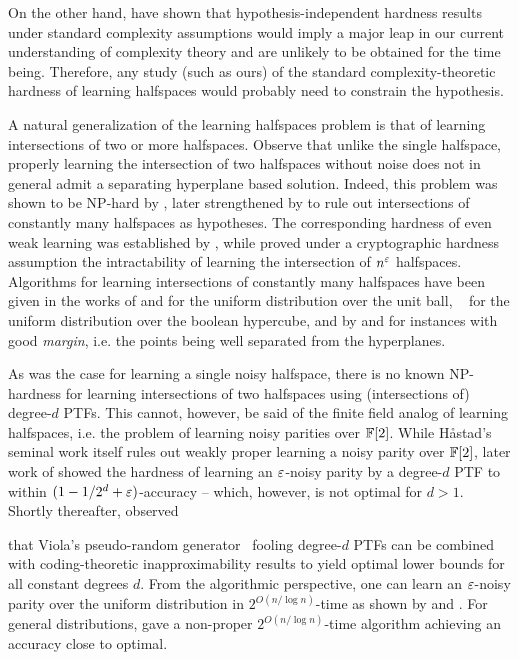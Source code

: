
On the other hand, \cite{ABX08} have shown that hypothesis-independent
hardness results under standard complexity assumptions would imply a
major leap in our current understanding of complexity theory and are
unlikely to be obtained for the time being. Therefore, any 
study (such as ours) of the standard complexity-theoretic hardness of learning
halfspaces would probably need to constrain the hypothesis. 


A natural generalization of the learning halfspaces problem is that of
learning intersections of two or more halfspaces.  Observe that unlike
the single halfspace, properly learning the intersection of two
halfspaces without noise does not in general admit a
separating hyperplane based solution.  Indeed, this problem was shown
to be NP-hard by \cite{BR93}, later strengthened by
\cite{ABFKP08} to
rule out intersections of constantly many halfspaces as hypotheses.
The corresponding hardness of even weak learning was established by
\cite{KS11}, while \cite{KS09}
proved under a cryptographic hardness assumption the intractability of
learning the intersection of $n^\varepsilon$ halfspaces. Algorithms
for learning intersections of constantly many halfspaces have been
given in the works of \cite{BK97} and
\cite{Vempala97} for the uniform distribution over the unit
ball, ~\cite{KOS04} for the uniform
distribution over the boolean hypercube, and by \cite{AV06} and \cite{KlivansS08} for instances
with good \emph{margin}, i.e. the points being well separated from the
hyperplanes.


As was the case for learning a single noisy halfspace, there is
no known NP-hardness for learning intersections of two halfspaces
using (intersections of) degree-$d$ PTFs. This cannot, however, be
said of the finite field analog of learning halfspaces, i.e. the
problem of learning noisy parities over $\mathbb{F}[2]$. While
H\r{a}stad's seminal work \cite{Hastad} itself rules out
weakly proper learning a noisy parity over $\mathbb{F}[2]$, later work of
\cite{GKS10} showed the hardness of
learning an $\varepsilon$-noisy parity by a degree-$d$ PTF to
within $(1 - 1/2^d + \varepsilon)$-accuracy  -- which, however, 
is not optimal for $d > 1$.
Shortly thereafter, \cite{Khot-personal} 
observed
that Viola's pseudo-random generator~\cite{Viola09} fooling degree-$d$
PTFs can be combined with coding-theoretic inapproximability 
results to yield
optimal lower bounds for all constant degrees $d$. From the
algorithmic perspective, one can learn an $\varepsilon$-noisy parity over the
uniform distribution in $2^{O(n/\log n)}$-time as shown by \cite{FGKP09} and \cite{BKW03}. For general
distributions, \cite{KMV08} gave a
non-proper $2^{O(n/\log n)}$-time algorithm achieving an accuracy
close to optimal. 

